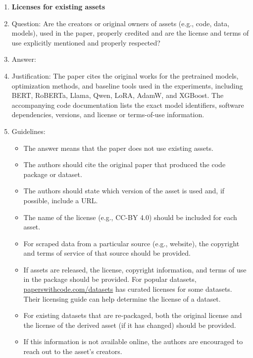 \documentclass{article}
\theoremstyle{plain}
\theoremstyle{definition}
\theoremstyle{remark}
\begin{document}
\begin{enumerate}
\item {\bf Licenses for existing assets}
    \item[] Question: Are the creators or original owners of assets (e.g., code, data, models), used in the paper, properly credited and are the license and terms of use explicitly mentioned and properly respected?
    \item[] Answer: \answerYes{}
    \item[] Justification: The paper cites the original works for the pretrained models, optimization methods, and baseline tools used in the experiments, including BERT, RoBERTa, Llama, Qwen, LoRA, AdamW, and XGBoost. The accompanying code documentation lists the exact model identifiers, software dependencies, versions, and license or terms-of-use information.
    \item[] Guidelines:
    \begin{itemize}
        \item The answer \answerNA{} means that the paper does not use existing assets.
        \item The authors should cite the original paper that produced the code package or dataset.
        \item The authors should state which version of the asset is used and, if possible, include a URL.
        \item The name of the license (e.g., CC-BY 4.0) should be included for each asset.
        \item For scraped data from a particular source (e.g., website), the copyright and terms of service of that source should be provided.
        \item If assets are released, the license, copyright information, and terms of use in the package should be provided. For popular datasets, \url{paperswithcode.com/datasets} has curated licenses for some datasets. Their licensing guide can help determine the license of a dataset.
        \item For existing datasets that are re-packaged, both the original license and the license of the derived asset (if it has changed) should be provided.
        \item If this information is not available online, the authors are encouraged to reach out to the asset's creators.
    \end{itemize}


\end{enumerate}
\end{document}
